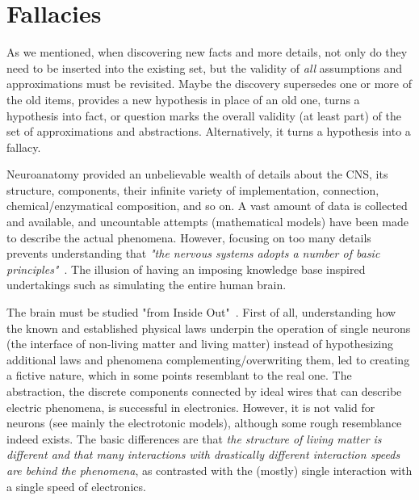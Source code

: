 \iflatexml
\else
\minitoc
\fi

\chapter{Fallacies\label{ch:Fallacies}}


As we mentioned, when discovering new facts and more details,
not only do they need to be inserted into the existing set,
but the validity of \textit{all} assumptions and approximations must be revisited.
Maybe the discovery supersedes one or more of the old items,
provides a new hypothesis in place of an old one,
turns a hypothesis into fact,
or question marks the overall validity (at least part) of the set of
approximations and abstractions. Alternatively, it turns a hypothesis into a \hypertarget{PhysiologyFallacy}{fallacy}.


Neuroanatomy provided an unbelievable wealth of details about the
\gls{CNS},
its structure, components, their infinite variety of implementation,
connection, chemical/enzymatical composition, and so on.
A vast amount of data is collected and available,
and uncountable attempts (mathematical models) have been made
to describe the actual phenomena. However, focusing on too many details
prevents understanding that \textit{"the nervous systems adopts
a number of basic principles"}~\cite{JohnstonWuNeurophysiology:1995}.
The illusion of having an imposing
knowledge base inspired undertakings such as simulating the entire human brain.

The brain must be studied "from Inside Out"~\cite{BuzsakiTheBrain:2019}.
First of all, understanding how the known and established physical laws
underpin the operation of single neurons (the interface of non-living matter
and living matter) instead of hypothesizing additional laws and phenomena
complementing/overwriting them, led to creating a fictive nature, which in some points
resemblant to the real one. The abstraction, the discrete components connected
by ideal wires that can describe electric phenomena, is successful in electronics. However, it is not valid for neurons (see mainly the electrotonic models),
although some rough resemblance indeed exists.
The basic differences are that  \textit{the structure of living matter is different and
that many interactions with drastically different interaction speeds
are behind the phenomena}, as contrasted with the (mostly) single interaction
with a single speed of electronics.

